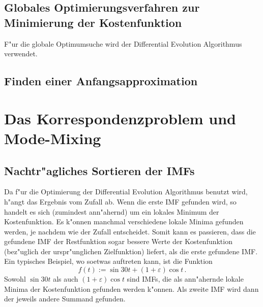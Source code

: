 \documentclass[a4paper]{scrartcl}
\begin{document}
\subsection{Globales Optimierungsverfahren zur Minimierung der Kostenfunktion}

F"ur die globale Optimumsuche wird der Differential Evolution Algorithmus \citep{StPr1997} verwendet. 


\subsection{Finden einer Anfangsapproximation}




\section{Das Korrespondenzproblem und Mode-Mixing}

\subsection{Nachtr"agliches Sortieren der IMFs}

Da f"ur die Optimierung der Differential Evolution Algorithmus benutzt wird, h"angt das Ergebnis vom Zufall ab. 
Wenn die erste IMF gefunden wird, so handelt es sich (zumindest ann"ahernd) um ein lokales Minimum der Kostenfunktion. 
Es k"onnen manchmal verschiedene lokale Minima gefunden werden, je nachdem wie der Zufall entscheidet. 
Somit kann es passieren, dass die gefundene IMF der Restfunktion sogar bessere Werte der Kostenfunktion (bez"uglich der urspr"unglichen Zielfunktion) liefert, als die erste gefundene IMF. 
Ein typisches Beispiel, wo soetwas auftreten kann, ist die Funktion
$$ f(t) := \sin 30t + (1+\varepsilon)\cos t\,. $$
Sowohl $\sin 30t$ als auch $(1+\varepsilon)\cos t$ sind IMFs, die als ann"ahernde lokale Minima der Kostenfunktion gefunden werden k"onnen. 
Als zweite IMF wird dann der jeweils andere Summand gefunden. 
\end{document}
